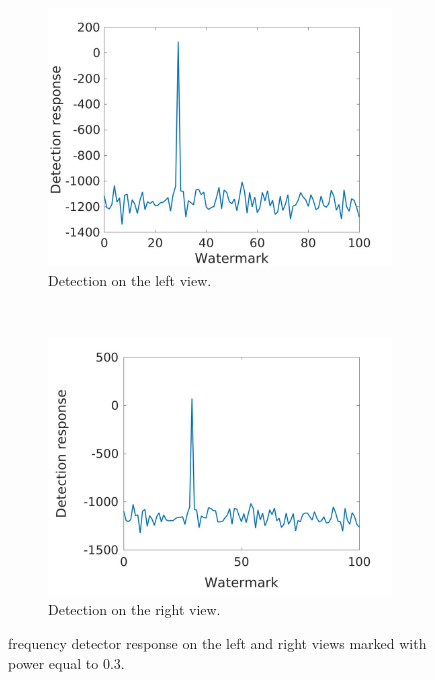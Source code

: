 \begin{figure}[h!]
    \centering
    \begin{subfigure}[t]{0.5\textwidth}
        \centering
       \includegraphics[width=1\textwidth]{./img/likelihood/correct_LikelihoodL_03.jpg}
          \caption{\small{Detection on the left view.}}
          \label{fig:Ll03}

    \end{subfigure}%
    ~ 
    \begin{subfigure}[t]{0.5\textwidth}
        \centering
        \includegraphics[width=1\textwidth]{./img/likelihood/correct_LikelihoodLr_03.jpg}
           \caption{\small{Detection on the right view.}}
           \label{fig:Lr03}
    \end{subfigure}
    \caption{frequency detector response on the left and right views marked with power equal to 0.3.}
     \label{fig:Lr}
\end{figure}
